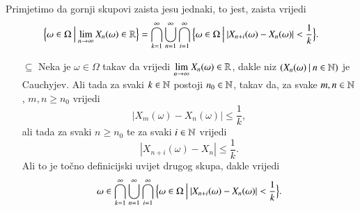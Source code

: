 \begin{nap} \label{nap:11.0-1}
    Primjetimo da gornji skupovi zaista jesu jednaki, to jest, zaista vrijedi
    \begin{equation*}
        \Big\{ {\omega \in \Omega} \: \Big| \: {\lim\limits_{n \to \infty} X_n (\omega) \in \mathbb{R}} \Big\}
        = \bigcap\limits_{k = 1}^{\infty} \bigcup\limits_{n = 1}^{\infty} \bigcap\limits_{i = 1}^{\infty} \Big\{ {\omega \in \Omega} \: \Big| \: {|X_{n + i} (\omega) - X_n (\omega)| < \frac{1}{k}} \Big\}.
    \end{equation*}
    \begin{enumerate}
        \item[$\subseteq$]
        Neka je $\omega \in \Omega$ takav da vrijedi $\lim\limits_{n \to \infty} X_n (\omega) \in \mathbb{R}$, dakle niz $({X_n (\omega) } \: | \: {n \in \mathbb{N}})$ je Cauchyjev.
        Ali tada za svaki $k \in \mathbb{N}$ postoji $n_0 \in \mathbb{N}$, takav da, za svake $m, n \in \mathbb{N}$, $m, n \geq n_0$ vrijedi
        \begin{equation*}
            | X_m (\omega) - X_n (\omega) | \leq \frac{1}{k},
        \end{equation*}
        ali tada za svaki $n \geq n_0$ te za svaki $i \in \mathbb{N}$ vrijedi
        \begin{equation*}
            | X_{n + i} (\omega) - X_n | \leq \frac{1}{k}.
        \end{equation*}
        Ali to je to\v cno definicijski uvijet drugog skupa, dakle vrijedi
        \begin{equation*}
            \omega \in \bigcap\limits_{k = 1}^{\infty} \bigcup\limits_{n = 1}^{\infty} \bigcap\limits_{i = 1}^{\infty} \Big\{ {\omega \in \Omega} \: \Big| \: {|X_{n + i} (\omega) - X_n (\omega)| < \frac{1}{k}} \Big\}.
        \end{equation*}


\end{enumerate}
\end{nap}
